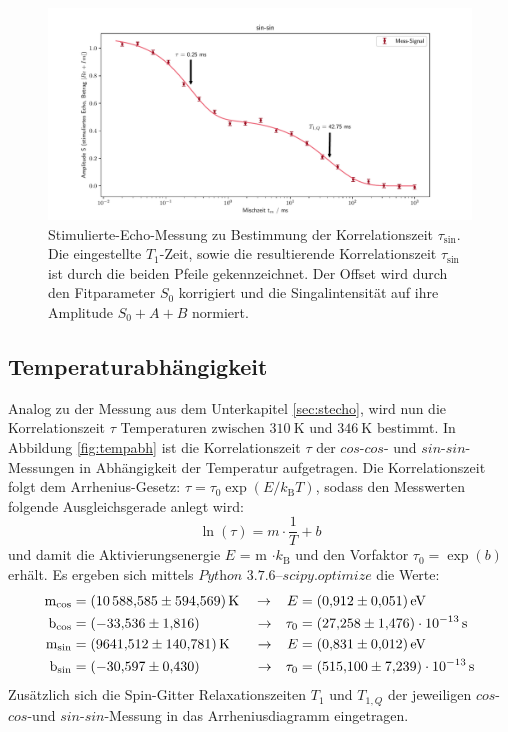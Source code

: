 \begin{figure}[H]
    \centering
    \includegraphics[width=\textwidth]{Auswertung/Para_der_Korrfkt/sin_sin.pdf}
    \caption{Stimulierte-Echo-Messung zu Bestimmung der Korrelationszeit
    $\tau_{\text{sin}}$. Die eingestellte $T_1$-Zeit, sowie die resultierende
    Korrelationszeit $\tau_{\text{sin}}$ ist durch die beiden Pfeile gekennzeichnet.
    Der Offset wird durch den Fitparameter $S_0$ korrigiert und die
    Singalintensität auf ihre Amplitude $S_0+A+B$ normiert.}
    \label{fig:sin}
\end{figure}

\subsection{Temperaturabhängigkeit}
\label{sec:tempabh}
Analog zu der Messung aus dem Unterkapitel \ref{sec:stecho}, wird nun die
Korrelationszeit $\tau$ Temperaturen zwischen $\SI{310}{\kelvin}$
und $\SI{346}{\kelvin}$ bestimmt. In Abbildung \ref{fig:tempabh}
ist die Korrelationszeit $\tau$ der $cos$-$cos$- und $sin$-$sin$-Messungen
in Abhängigkeit der Temperatur aufgetragen. Die Korrelationszeit folgt
dem Arrhenius-Gesetz: $\tau = \tau_0 \exp{(E/k_{\text{B}}T)}$, sodass den Messwerten
folgende Ausgleichsgerade anlegt wird:
\begin{equation*}
  \ln{(\tau)} = m \cdot \frac{1}{T} + b
\end{equation*}
\noindent
und damit die Aktivierungsenergie $E$ = m $\cdot k_{\text{B}}$ und den Vorfaktor
$\tau_0 = \exp{(b)}$ erhält. Es ergeben sich mittels
$\textit{Python 3.7.6--scipy.optimize}$ die Werte:
\begin{align*}
  \text{m}_{\text{cos}} &= \SI{10588,585\pm594,569}{\kelvin}
  \quad\rightarrow
  &E &= \SI{0.912\pm0.051}{\electronvolt} \\
  \text{b}_{\text{cos}} &= \SI{-33,536\pm1,816}
  \qquad\quad\,\;\;\rightarrow
  &\tau_0 &= \SI{27,258\pm1,476 e-13}{\second} \\
  \text{m}_{\text{sin}} &= \SI{9641,512\pm140,781}{\kelvin}
  \,\;\;\quad\rightarrow
  &E &= \SI{0.831\pm0.012}{\electronvolt} \\
  \text{b}_{\text{sin}} &= \SI{-30,597\pm0.430}
  \qquad\quad\,\;\;\rightarrow
  &\tau_0 &= \SI{515,100\pm7,239 e-13}{\second}
\end{align*}
\noindent
Zusätzlich sich die Spin-Gitter Relaxationszeiten $T_1$ und $T_{1,Q}$
der jeweiligen $cos$-$cos$-und $sin$-$sin$-Messung in das Arrheniusdiagramm eingetragen.

